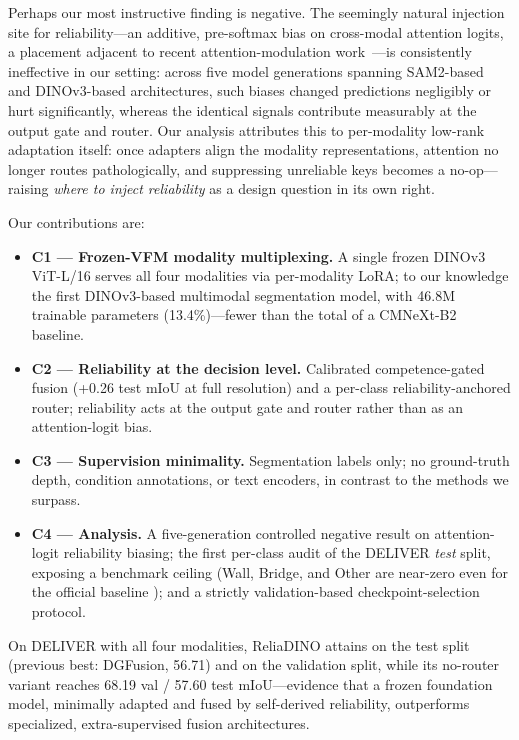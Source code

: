 Perhaps our most instructive finding is negative. The seemingly natural injection site for reliability---an additive, pre-softmax bias on cross-modal attention logits, a placement adjacent to recent attention-modulation work~\cite{sam2long2024,sae2026,primed2026}---is consistently ineffective in our setting: across five model generations spanning SAM2-based~\cite{sam2_2024,memorysam2025} and DINOv3-based architectures, such biases changed predictions negligibly or hurt significantly, whereas the identical signals contribute measurably at the output gate and router. Our analysis attributes this to per-modality low-rank adaptation itself: once adapters align the modality representations, attention no longer routes pathologically, and suppressing unreliable keys becomes a no-op---raising \emph{where to inject reliability} as a design question in its own right.

Our contributions are:
\begin{itemize}
  \item \textbf{C1 --- Frozen-VFM modality multiplexing.} A single frozen DINOv3 ViT-L/16 serves all four modalities via per-modality LoRA; to our knowledge the first DINOv3-based multimodal segmentation model, with 46.8M trainable parameters (13.4\%)---fewer than the total of a CMNeXt-B2 baseline.
  \item \textbf{C2 --- Reliability at the decision level.} Calibrated competence-gated fusion (+0.26 test mIoU at full resolution) and a per-class reliability-anchored router; reliability acts at the output gate and router rather than as an attention-logit bias.
  \item \textbf{C3 --- Supervision minimality.} Segmentation labels only; no ground-truth depth, condition annotations, or text encoders, in contrast to the methods we surpass.
  \item \textbf{C4 --- Analysis.} A five-generation controlled negative result on attention-logit reliability biasing; the first per-class audit of the DELIVER \emph{test} split, exposing a benchmark ceiling (Wall, Bridge, and Other are near-zero even for the official baseline ); and a strictly validation-based checkpoint-selection protocol.
\end{itemize}

On DELIVER with all four modalities, ReliaDINO attains  on the test split (previous best: DGFusion, 56.71) and  on the validation split, while its no-router variant reaches 68.19 val / 57.60 test mIoU---evidence that a frozen foundation model, minimally adapted and fused by self-derived reliability, outperforms specialized, extra-supervised fusion architectures.

